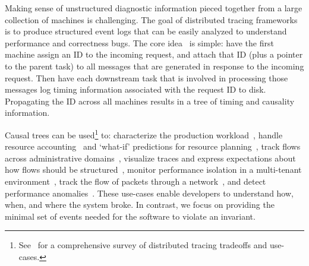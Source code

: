  Making sense of unstructured diagnostic
information pieced together from a large collection of machines is
challenging. The goal of distributed tracing frameworks is to
produce structured event logs that can be easily analyzed to understand performance and
correctness bugs. The core idea~\cite{path} is simple: have the first machine assign an ID to the incoming request,
and attach that ID (plus a pointer to the parent task) to all messages that are generated in response to the
incoming request. Then have each downstream task that is involved in processing those
messages log timing information associated with the request ID to disk.
Propagating the ID across all machines results in a tree of
timing and causality information.

Causal trees can be used\footnote{See~\cite{tracing_overview} for a
comprehensive survey of distributed tracing tradeoffs and use-cases.} to: characterize the
production workload~\cite{barham2004using}, handle
resource accounting~\cite{stardust} and `what-if' predictions for resource
planning~\cite{ironmodel},
track flows across administrative domains~\cite{fonseca2007x}, visualize traces and express expectations about how flows should
be structured~\cite{pip}, monitor performance isolation in a multi-tenant
environment~\cite{retro}, track the flow of packets through a
network~\cite{ndb}, and detect performance anomalies~\cite{perf_changes}.
These use-cases enable developers to understand
how, when, and where the system broke. In contrast, we focus on providing the
minimal set of events needed for the software
to violate an invariant.


